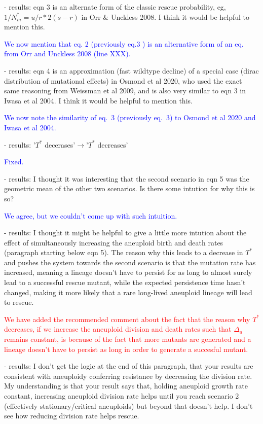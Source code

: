 \documentclass[12pt]{extarticle}
\begin{document}
- results: eqn 3 is an alternate form of the classic rescue probability, eg, $1/N_m^*=u/r*2(s-r)$ in Orr $\&$ Unckless 2008. I think it would be helpful to mention this.

\textcolor{blue}{ %
We now mention that eq. 2 (previously eq.3 ) is an alternative form of an eq. from Orr and Unckless 2008 (line XXX).
} 

- results: eqn 4 is an approximation (fast wildtype decline) of a special case (dirac distribution of mutational effects) in Osmond et al 2020, who used the exact same reasoning from Weissman et al 2009, and is also very similar to eqn 3 in Iwasa et al 2004. I think it would be helpful to mention this.

\textcolor{blue}{%
We now note the similarity of eq.~3 (previously eq.~3) to Osmond et al 2020 and Iwasa et al 2004.
} 

- results: '$T^*$ decerases'$\rightarrow$'$T^*$ decreases'

\textcolor{blue}{Fixed.} %

- results: I thought it was interesting that the second scenario in eqn 5 was the geometric mean of the other two scenarios. Is there some intution for why this is so?

\textcolor{blue}{We agree, but we couldn't come up with such intuition.} 

- results: I thought it might be helpful to give a little more intution about the effect of simultaneously increasing the aneuploid birth and death rates (paragraph starting below eqn 5). The reason why this leads to a decrease in $T^*$ and pushes the system towards the second scenario is that the mutation rate has increased, meaning a lineage doesn't have to persist for as long to almost surely lead to a successful rescue mutant, while the expected persistence time hasn't changed, making it more likely that a rare long-lived aneuploid lineage will lead to rescue.

\textcolor{red}{%
We have added the recommended comment about the fact that the reason why $T^*$ decreases, if we increase the aneuploid division and death rates such that $\Delta_a$ remains constant, is because of the fact that more mutants are generated and a lineage doesn't have to persist as long in order to generate a succesful mutant.
} 

- results: I don't get the logic at the end of this paragraph, that your results are consistent with aneuploidy conferring resistance by decreasing the division rate. My understanding is that your result says that, holding aneuploid growth rate constant, increasing aneuploid division rate helps until you reach scenario 2 (effectively stationary/critical aneuploids) but beyond that doesn't help. I don't see how reducing division rate helps rescue.
\end{document}
